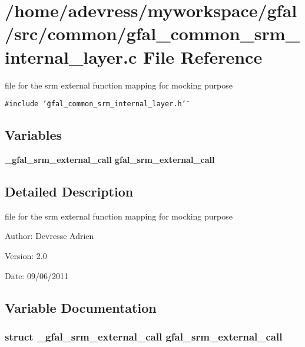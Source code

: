 \section{/home/adevress/myworkspace/gfal/src/common/gfal\_\-common\_\-srm\_\-internal\_\-layer.c File Reference}
\label{gfal__common__srm__internal__layer_8c}
file for the srm external function mapping for mocking purpose 

{\tt \#include \char`\"{}gfal\_\-common\_\-srm\_\-internal\_\-layer.h\char`\"{}}\par
\subsection*{Variables}
\begin{CompactItemize}
\item 
\bf{\_\-gfal\_\-srm\_\-external\_\-call} \textbf{gfal\_\-srm\_\-external\_\-call}
\end{CompactItemize}


\subsection{Detailed Description}
file for the srm external function mapping for mocking purpose 

\begin{Desc}
\item[Author:]Devresse Adrien \end{Desc}
\begin{Desc}
\item[Version:]2.0 \end{Desc}
\begin{Desc}
\item[Date:]09/06/2011 \end{Desc}


\subsection{Variable Documentation}
\subsubsection{\setlength{\rightskip}{0pt plus 5cm}struct \bf{\_\-gfal\_\-srm\_\-external\_\-call} gfal\_\-srm\_\-external\_\-call}\label{gfal__common__srm__internal__layer_8c_67b12c7342043451fc5ce31b1a3d74fb}


